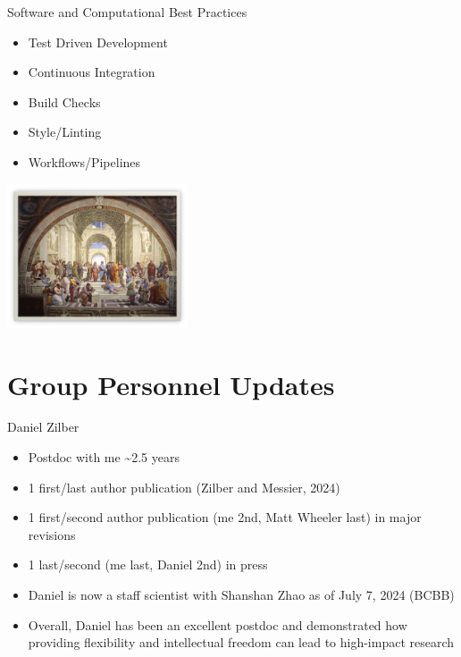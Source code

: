 \documentclass[
  ignorenonframetext,
]{beamer}
\providecommand{\tightlist}{%
  \setlength{\itemsep}{0pt}\setlength{\parskip}{0pt}}\usepackage{longtable,booktabs,array}
\begin{document}
\begin{frame}{Software and Computational Best Practices}
\label{software-and-computational-best-practices}
\begin{itemize}
\tightlist
\item
  Test Driven Development
\item
  Continuous Integration
\item
  Build Checks
\item
  Style/Linting
\item
  Workflows/Pipelines
\end{itemize}

\begin{center}
\includegraphics[width=0.4\textwidth,height=\textheight]{../../presentations/20240223_CEHD_Workshop/Raphael.jpg}
\end{center}
\end{frame}

\section{Group Personnel Updates}\label{group-personnel-updates}

\begin{frame}{Daniel Zilber}
\label{daniel-zilber}
\begin{itemize}
\tightlist
\item
  Postdoc with me \textasciitilde2.5 years
\item
  1 first/last author publication (Zilber and Messier, 2024)
\item
  1 first/second author publication (me 2nd, Matt Wheeler last) in major
  revisions
\item
  1 last/second (me last, Daniel 2nd) in press
\item
  Daniel is now a staff scientist with Shanshan Zhao as of July 7, 2024
  (BCBB)
\item
  Overall, Daniel has been an excellent postdoc and demonstrated how
  providing flexibility and intellectual freedom can lead to high-impact
  research
\end{itemize}
\end{frame}
\end{document}
